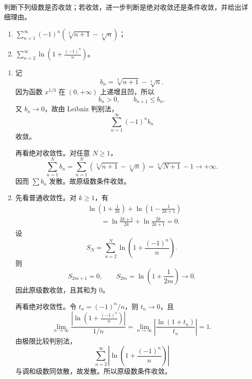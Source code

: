 
\begin{question}[20分]
判断下列级数是否收敛；若收敛，进一步判断是绝对收敛还是条件收敛，并给出详细理由。
\begin{enumerate}
  \item $\displaystyle \sum_{n=1}^{\infty}(-1)^n\left(\sqrt[3]{n+1}-\sqrt[3]{n}\right)$；
  \item $\displaystyle \sum_{n=2}^{\infty}\ln\left(1+\frac{(-1)^n}{n}\right)$。
\end{enumerate}
\begin{solution}
\begin{enumerate}
  \item 记
  \[
    b_n=\sqrt[3]{n+1}-\sqrt[3]{n}.
  \]
  因为函数 $x^{1/3}$ 在 $(0,+\infty)$ 上递增且凹，所以
  \[
    b_n>0,\qquad b_{n+1}\le b_n.
  \]
  又 $b_n\to0$，故由 Leibniz 判别法，
  \[
    \sum_{n=1}^{\infty}(-1)^n b_n
  \]
  收敛。

  再看绝对收敛性。对任意 $N\ge1$，
  \[
    \sum_{n=1}^{N}b_n
    =\sum_{n=1}^{N}\left(\sqrt[3]{n+1}-\sqrt[3]{n}\right)
    =\sqrt[3]{N+1}-1\to+\infty .
  \]
  因而 $\sum b_n$ 发散。故原级数条件收敛。

  \item 先看普通收敛性。对 $k\ge1$，有
  \[
  \begin{aligned}
    &\ln\left(1+\frac1{2k}\right)
    +\ln\left(1-\frac1{2k+1}\right)  \\
    &\qquad
    =\ln\frac{2k+1}{2k}+\ln\frac{2k}{2k+1}=0 .
  \end{aligned}
  \]
  设
  \[
    S_N=\sum_{n=2}^{N}\ln\left(1+\frac{(-1)^n}{n}\right).
  \]
  则
  \[
    S_{2m+1}=0,\qquad
    S_{2m}=\ln\left(1+\frac1{2m}\right)\to0 .
  \]
  因此原级数收敛，且其和为 $0$。

  再看绝对收敛性。令 $t_n=(-1)^n/n$，则 $t_n\to0$，且
  \[
    \lim_{n\to\infty}
    \frac{\left|\ln\left(1+\frac{(-1)^n}{n}\right)\right|}{1/n}
    =
    \lim_{n\to\infty}\left|\frac{\ln(1+t_n)}{t_n}\right|
    =1 .
  \]
  由极限比较判别法，
  \[
    \sum_{n=2}^{\infty}
    \left|\ln\left(1+\frac{(-1)^n}{n}\right)\right|
  \]
  与调和级数同敛散，故发散。所以原级数条件收敛。
\end{enumerate}
\end{solution}
\end{question}

